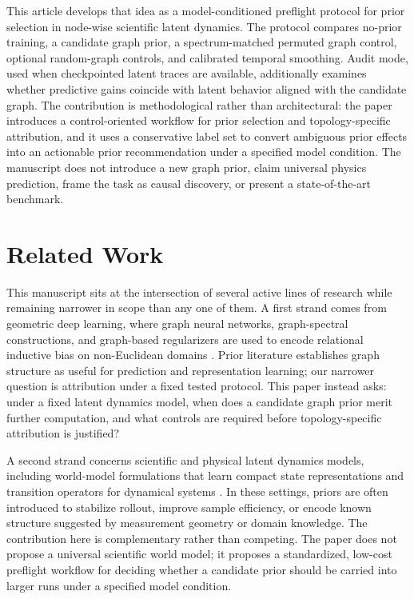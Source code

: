 \documentclass[preprint,12pt]{elsarticle}
\begin{document}
This article develops that idea as a model-conditioned preflight protocol for prior selection in node-wise scientific latent dynamics. The protocol compares no-prior training, a candidate graph prior, a spectrum-matched permuted graph control, optional random-graph controls, and calibrated temporal smoothing. Audit mode, used when checkpointed latent traces are available, additionally examines whether predictive gains coincide with latent behavior aligned with the candidate graph. The contribution is methodological rather than architectural: the paper introduces a control-oriented workflow for prior selection and topology-specific attribution, and it uses a conservative label set to convert ambiguous prior effects into an actionable prior recommendation under a specified model condition. The manuscript does not introduce a new graph prior, claim universal physics prediction, frame the task as causal discovery, or present a state-of-the-art benchmark.

\section{Related Work}

This manuscript sits at the intersection of several active lines of research while remaining narrower in scope than any one of them. A first strand comes from geometric deep learning, where graph neural networks, graph-spectral constructions, and graph-based regularizers are used to encode relational inductive bias on non-Euclidean domains \citep{bronstein2021geometric,chung1997spectral}. Prior literature establishes graph structure as useful for prediction and representation learning; our narrower question is attribution under a fixed tested protocol. This paper instead asks: under a fixed latent dynamics model, when does a candidate graph prior merit further computation, and what controls are required before topology-specific attribution is justified?

A second strand concerns scientific and physical latent dynamics models, including world-model formulations that learn compact state representations and transition operators for dynamical systems \citep{hansen2024tdmpc2,hafner2023dreamerv3,hansen2024puppeteer}. In these settings, priors are often introduced to stabilize rollout, improve sample efficiency, or encode known structure suggested by measurement geometry or domain knowledge. The contribution here is complementary rather than competing. The paper does not propose a universal scientific world model; it proposes a standardized, low-cost preflight workflow for deciding whether a candidate prior should be carried into larger runs under a specified model condition.
\end{document}

